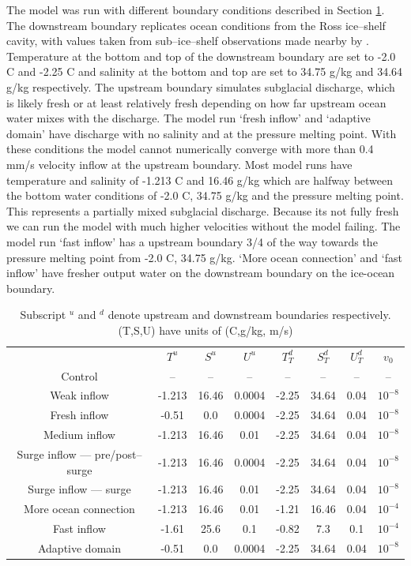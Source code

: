 The model was run with different boundary conditions described in Section \ref{tab:model_runs}. The downstream boundary replicates ocean conditions from the Ross ice--shelf cavity, with values taken from sub--ice--shelf observations made nearby by \citep{robinson2020ice}. 
Temperature at the bottom and top of the downstream boundary are set to -2.0 \textdegree C and -2.25 \textdegree C and salinity at the bottom and top are set to 34.75 g/kg and 34.64 g/kg respectively. 
The upstream boundary simulates subglacial discharge, which is likely fresh or at least relatively fresh depending on how far upstream ocean water mixes with the discharge. The model run `fresh inflow' and `adaptive domain' have discharge with no salinity and at the pressure melting point. With these conditions the model cannot numerically converge with more than 0.4 mm/s velocity inflow at the upstream boundary. Most model runs have temperature and salinity of -1.213 \textdegree C and 16.46 g/kg which are halfway between the bottom water conditions of -2.0 \textdegree C, 34.75 g/kg and the pressure melting point. This represents a partially mixed subglacial discharge. Because its not fully fresh we can run the model with much higher velocities without the model failing. The model run `fast inflow' has a upstream boundary 3/4 of the way towards the pressure melting point from -2.0 \textdegree C, 34.75 g/kg. `More ocean connection' and `fast inflow' have fresher output water on the downstream boundary on the ice-ocean boundary. 
\begin{table}
\begin{tabular}{c|c|c|c|c|c|c|c}
    & $T^{u}$ & $S^{u} $ & $U^{u}$& $T^d_T$ & $S^d_T$ & $U^d_T$ & $v_0$ \\
    Control & -- & -- & --& -- &--  &--  &--  \\
    Weak inflow & -1.213 & 16.46  &0.0004 &  -2.25 & 34.64 & 0.04 & $10^{-8}$  \\
    Fresh inflow & -0.51 & 0.0 &0.0004 &  -2.25 & 34.64 & 0.04 & $10^{-8}$  \\
    Medium inflow & -1.213 & 16.46 & 0.01 &  -2.25 & 34.64 & 0.04  & $10^{-8}$ \\
    Surge inflow --- pre/post--surge  & -1.213 & 16.46  &0.0004 &  -2.25 & 34.64 & 0.04 & $10^{-8}$ \\
    Surge inflow --- surge & -1.213 & 16.46 & 0.01 &  -2.25 & 34.64 & 0.04  & $10^{-8}$ \\
    More ocean connection & -1.213 & 16.46 & 0.01 &  -1.21 & 16.46 & 0.04& $10^{-4}$  \\
    Fast inflow & -1.61 & 25.6 & 0.1 & -0.82 & 7.3  & 0.1 & $10^{-4}$ \\
    Adaptive domain  & -0.51 & 0.0 &0.0004 &  -2.25 & 34.64 & 0.04 & $10^{-8}$ 


\end{tabular}
\caption[]{\label{tab:model_runs} Subscript $^u$ and $^d$ denote upstream and downstream boundaries respectively. (T,S,U) have units of (\textdegree C,g/kg, m/s)  }
\end{table}

